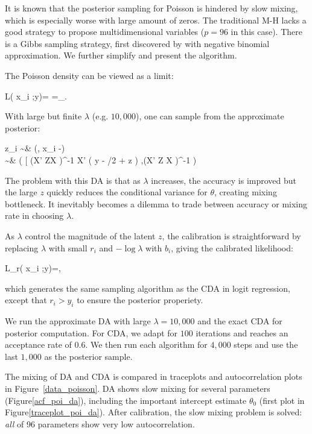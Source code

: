 \documentclass[10pt]{article}
\newcommand{\xbeta}{ x_i \theta}
\newcommand{\be}{\begin{equs}}
\newcommand{\ee}{\end{equs}}
\DeclareMathOperator{\No}{No}
\DeclareMathOperator{\PG}{PG}
\begin{document}
It is known that the posterior sampling for Poisson is hindered by slow mixing, which is especially worse with large amount of zeros. The traditional M-H lacks a good strategy to propose multidimensional variables ($p=96$ in this case). There is a Gibbs sampling strategy, first discovered by \citep{zhou2012lognormal} with negative binomial approximation. We further simplify and present the algorithm.

The Poisson density can be viewed as a limit:
\be
L(\xbeta;y)=\frac{ \exp(y_i \xbeta)}{\exp\{\exp(\xbeta)\}y!} =\lim_{\lambda\rightarrow\infty}\frac{\exp(y_i \xbeta)}{\{1+ \exp(\xbeta)/\lambda\}^{\lambda}y!}.
\ee

With large but finite $\lambda$ (e.g. $10,000$), one can sample from the approximate posterior:

\be
z_i \sim & \PG\left (\lambda, \xbeta -\log \lambda\right)\\
\theta \sim & \No \left( \big[ (X' ZX )^{-1} X'  \big ( y - \lambda/2 + z \log \lambda \big) ,(X' Z X )^{-1} \right)
\ee

The problem with this DA is that as $\lambda$ increases, the accuracy is improved but the large $z$ quickly reduces the conditional variance for $\theta$, creating mixing bottleneck. It inevitably becomes a dilemma to trade between accuracy or mixing rate in choosing $\lambda$.

As $\lambda$ control the magnitude of the latent $z$, the calibration is straightforward by replacing $\lambda$ with small $r_i$ and $-\log \lambda$ with $b_i$, giving the calibrated likelihood:

\be
L_r(\xbeta;y)=\frac{\exp \{ y_i (\xbeta + b_i)\}}{\{1+ \exp (\xbeta + b_i)\}^{r_i}},
\ee
which generates the same sampling algorithm as the CDA in logit regression, except that $r_i>y_i$ to ensure the posterior properiety.

We run the approximate DA with large $\lambda=10,000$ and the exact CDA for posterior computation. For CDA, we adapt for $100$ iterations and reaches an acceptance rate of $0.6$. We then run each algorithm for $4,000$ steps and use the last $1,000$ as the posterior sample.

The mixing of DA and CDA is compared in traceplots and autocorrelation plots in Figure~\ref{data_poisson}. DA shows slow mixing for several parameters (Figure\ref{acf_poi_da}), including the important intercept estimate $\theta_0$ (first plot in Figure\ref{traceplot_poi_da}). After calibration, the slow mixing problem is solved:  {\it all} of 96 parameters show very low autocorrelation.
\end{document}
